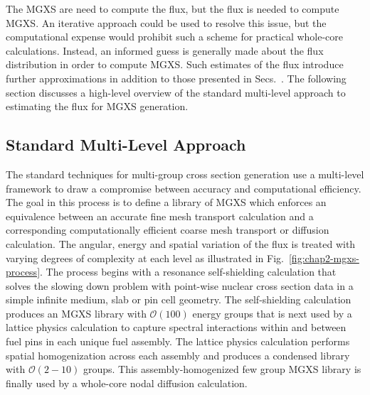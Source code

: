 The \ac{MGXS} are need to compute the flux, but the flux is needed to compute \ac{MGXS}. An iterative approach could be used to resolve this issue, but the computational expense would prohibit such a scheme for practical whole-core calculations. Instead, an informed guess is generally made about the flux distribution in order to compute \ac{MGXS}. Such estimates of the flux introduce further approximations in addition to those presented in Secs.~. The following section discusses a high-level overview of the standard multi-level approach to estimating the flux for \ac{MGXS} generation.


\subsection{Standard Multi-Level Approach}
\label{subsec:chap2-mgxs-lib-std-approach}

The standard techniques for multi-group cross section generation use a multi-level framework to draw a compromise between accuracy and computational efficiency. The goal in this process is to define a library of \ac{MGXS} which enforces an equivalence between an accurate fine mesh transport calculation and a corresponding computationally efficient coarse mesh transport or diffusion calculation. The angular, energy and spatial variation of the flux is treated with varying degrees of complexity at each level as illustrated in Fig.~\ref{fig:chap2-mgxs-process}. The process begins with a resonance self-shielding calculation that solves the slowing down problem with point-wise nuclear cross section data in a simple infinite medium, slab or pin cell geometry. The self-shielding calculation produces an \ac{MGXS} library with $\mathcal{O}(100)$ energy groups that is next used by a lattice physics calculation to capture spectral interactions within and between fuel pins in each unique fuel assembly. The lattice physics calculation performs spatial homogenization across each assembly and produces a condensed library with $\mathcal{O}(2-10)$ groups. This assembly-homogenized few group \ac{MGXS} library is finally used by a whole-core nodal diffusion calculation.

